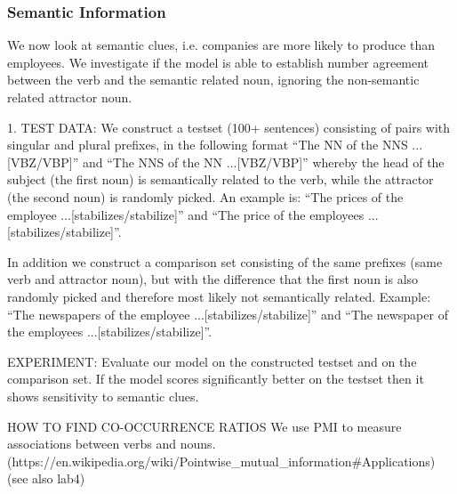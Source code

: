 \begin{multicols}{2}


\subsubsection{Semantic Information}

We now look at semantic clues, i.e. companies
are more likely to produce than employees.
We investigate if the model is able to establish
number agreement between the verb and the semantic related noun,
ignoring the non-semantic related attractor noun.
  
1. TEST DATA:
We construct a testset (100+ sentences) consisting of pairs with singular and plural prefixes, in the following format  
``The NN of the NNS ...[VBZ/VBP]'' and
``The NNS of the NN ...[VBZ/VBP]'' 
whereby the head of the subject (the first noun)
is semantically related to the verb, while the attractor (the second noun)
is randomly picked. An example is:
``The prices of the employee ...[stabilizes/stabilize]'' and 
``The price of the employees ...[stabilizes/stabilize]''.

In addition we construct a comparison set consisting of the same prefixes
(same verb and attractor noun),
but with the difference that the first noun is also randomly picked and
therefore most likely not semantically related. Example:
``The newspapers of the employee ...[stabilizes/stabilize]'' and 
``The newspaper of the employees ...[stabilizes/stabilize]''.


EXPERIMENT:
Evaluate our model on the constructed testset and on the comparison set.
If the model scores significantly better on the testset
then it shows sensitivity to semantic clues.


HOW TO FIND CO-OCCURRENCE RATIOS
We use PMI to measure associations between verbs and nouns.
(https://en.wikipedia.org/wiki/Pointwise_mutual_information#Applications)
(see also lab4)


\end{multicols}

